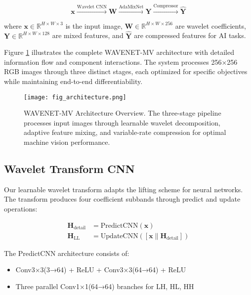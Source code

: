 \documentclass[conference]{IEEEtran}
\begin{document}
\begin{equation}
\mathbf{x} \xrightarrow{\text{Wavelet CNN}} \mathbf{W} \xrightarrow{\text{AdaMixNet}} \mathbf{Y} \xrightarrow{\text{Compressor}} \hat{\mathbf{Y}}
\end{equation}

where $\mathbf{x} \in \mathbb{R}^{H \times W \times 3}$ is the input image, $\mathbf{W} \in \mathbb{R}^{H \times W \times 256}$ are wavelet coefficients, $\mathbf{Y} \in \mathbb{R}^{H \times W \times 128}$ are mixed features, and $\hat{\mathbf{Y}}$ are compressed features for AI tasks.

Figure \ref{fig:architecture} illustrates the complete WAVENET-MV architecture with detailed information flow and component interactions. The system processes 256×256 RGB images through three distinct stages, each optimized for specific objectives while maintaining end-to-end differentiability.

\begin{figure}[htbp]
\centering
\texttt{[image: fig\_architecture.png]}
\caption{WAVENET-MV Architecture Overview. The three-stage pipeline processes input images through learnable wavelet decomposition, adaptive feature mixing, and variable-rate compression for optimal machine vision performance.}
\label{fig:architecture}
\end{figure}

\subsection{Wavelet Transform CNN}

Our learnable wavelet transform adapts the lifting scheme \cite{daubechies1998factoring} for neural networks. The transform produces four coefficient subbands through predict and update operations:

\begin{align}
\mathbf{H}_{\text{detail}} &= \text{PredictCNN}(\mathbf{x}) \\
\mathbf{H}_{\text{LL}} &= \text{UpdateCNN}([\mathbf{x} \| \mathbf{H}_{\text{detail}}])
\end{align}

The PredictCNN architecture consists of:
\begin{itemize}
\item Conv3×3(3→64) + ReLU + Conv3×3(64→64) + ReLU
\item Three parallel Conv1×1(64→64) branches for LH, HL, HH
\end{itemize}
\end{document}
